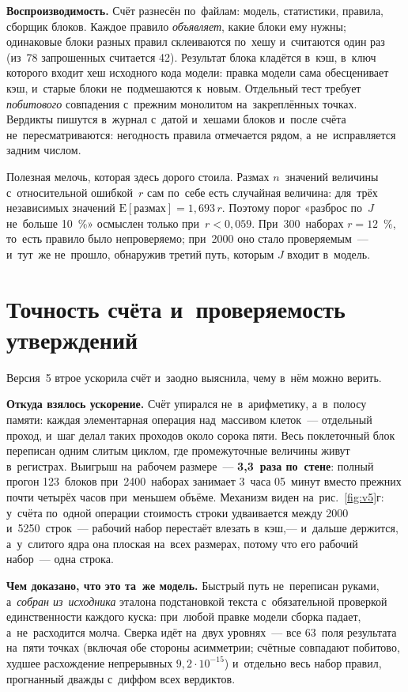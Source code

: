 \documentclass[11pt,a4paper,landscape,twocolumn]{article}
\begin{document}
\textbf{Воспроизводимость.} Счёт разнесён по~файлам: модель, статистики, правила, сборщик блоков. Каждое правило \emph{объявляет}, какие блоки ему нужны; одинаковые блоки разных правил склеиваются по~хешу и~считаются один раз (из~78 запрошенных считается 42). Результат блока кладётся в~кэш, в~ключ которого входит хеш исходного кода модели: правка модели сама обесценивает кэш, и~старые блоки не~подмешаются к~новым. Отдельный тест требует \emph{побитового} совпадения с~прежним монолитом на~закреплённых точках. Вердикты пишутся в~журнал с~датой и~хешами блоков и~после счёта не~пересматриваются: негодность правила отмечается рядом, а~не~исправляется задним числом.

\begin{ineq}
Полезная мелочь, которая здесь дорого стоила. Размах $n$~значений величины с~относительной ошибкой~$r$ сам по~себе есть случайная величина: для~трёх независимых значений $\mathrm{E}[\text{размах}]=1{,}693\,r$. Поэтому порог «разброс по~$J$ не~больше 10~\%» осмыслен только при~$r<0{,}059$. При~300~наборах $r=12$~\%, то~есть правило было непроверяемо; при~2000 оно стало проверяемым~— и~тут~же не~прошло, обнаружив третий путь, которым $J$ входит в~модель.
\end{ineq}

\section{Точность счёта и~проверяемость утверждений}\label{sec:prec}
Версия~5 втрое ускорила счёт и~заодно выяснила, чему в~нём можно верить.

\textbf{Откуда взялось ускорение.} Счёт упирался не~в~арифметику, а~в~полосу памяти: каждая элементарная операция над~массивом клеток~— отдельный проход, и~шаг делал таких проходов около сорока пяти. Весь поклеточный блок переписан одним слитым циклом, где промежуточные величины живут в~регистрах. Выигрыш на~рабочем размере~— \textbf{3,3~раза по~стене}: полный прогон 123~блоков при~2400~наборах занимает 3~часа 05~минут вместо прежних почти четырёх часов при~меньшем объёме. Механизм виден на~рис.~\ref{fig:v5}г: у~счёта по~одной операции стоимость строки удваивается между 2000 и~5250~строк~— рабочий набор перестаёт влезать в~кэш,— и~дальше держится, а~у~слитого ядра она плоская на~всех размерах, потому что его рабочий набор~— одна строка.

\textbf{Чем доказано, что это та~же модель.} Быстрый путь не~переписан руками, а~\emph{собран из~исходника} эталона подстановкой текста с~обязательной проверкой единственности каждого куска: при~любой правке модели сборка падает, а~не~расходится молча. Сверка идёт на~двух уровнях~— все 63~поля результата на~пяти точках (включая обе стороны асимметрии; счётные совпадают побитово, худшее расхождение непрерывных $9{,}2\cdot10^{-15}$) и~отдельно весь набор правил, прогнанный дважды с~диффом всех вердиктов.
\end{document}
